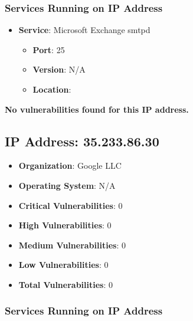 \documentclass{article}
\begin{document}
\subsubsection*{Services Running on IP Address}

\begin{itemize}
    
        \item \textbf{Service}: Microsoft Exchange smtpd
        \begin{itemize}
            \item \textbf{Port}: 25
            \item \textbf{Version}:  N/A 
            \item \textbf{Location}: \href{  }{  }
        \end{itemize}
    
\end{itemize}


\textbf{No vulnerabilities found for this IP address.}




\clearpage



\subsection{IP Address: 35.233.86.30}

\begin{itemize}
    \item \textbf{Organization}: Google LLC
    \item \textbf{Operating System}:  N/A 
    \item \textbf{Critical Vulnerabilities}: 0
    \item \textbf{High Vulnerabilities}: 0
    \item \textbf{Medium Vulnerabilities}: 0
    \item \textbf{Low Vulnerabilities}: 0
    \item \textbf{Total Vulnerabilities}: 0
\end{itemize}

\subsubsection*{Services Running on IP Address}
\end{document}
